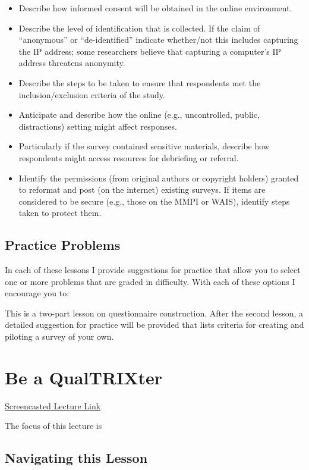 \documentclass[
  english,
]{book}
\providecommand{\tightlist}{%
  \setlength{\itemsep}{0pt}\setlength{\parskip}{0pt}}
\begin{document}
\begin{itemize}
\tightlist
\item
  Describe how informed consent will be obtained in the online environment.
\item
  Describe the level of identification that is collected. If the claim of ``anonymous'' or ``de-identified'' indicate whether/not this includes capturing the IP address; some researchers believe that capturing a computer's IP address threatens anonymity.
\item
  Describe the steps to be taken to ensure that respondents met the inclusion/exclusion criteria of the study.
\item
  Anticipate and describe how the online (e.g., uncontrolled, public, distractions) setting might affect responses.
\item
  Particularly if the survey contained sensitive materials, describe how respondents might access resources for debriefing or referral.
\item
  Identify the permissions (from original authors or copyright holders) granted to reformat and post (on the internet) existing surveys. If items are considered to be secure (e.g., those on the MMPI or WAIS), identify steps taken to protect them.
\end{itemize}

\hypertarget{practice-problems}{%
\section{Practice Problems}\label{practice-problems}}

In each of these lessons I provide suggestions for practice that allow you to select one or more problems that are graded in difficulty. With each of these options I encourage you to:

This is a two-part lesson on questionnaire construction. After the second lesson, a detailed suggestion for practice will be provided that lists criteria for creating and piloting a survey of your own.

\hypertarget{qualTRIX}{%
\chapter{Be a QualTRIXter}\label{qualTRIX}}

\href{link}{Screencasted Lecture Link}

The focus of this lecture is

\hypertarget{navigating-this-lesson-1}{%
\section{Navigating this Lesson}\label{navigating-this-lesson-1}}
\end{document}
